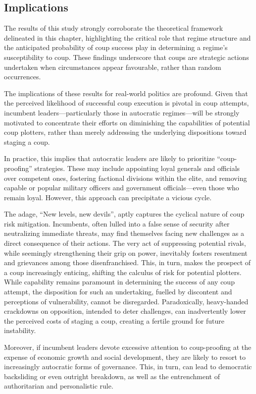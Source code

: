 \documentclass[
  12pt,
]{report}
\begin{document}
\subsection{Implications}\label{implications}

The results of this study strongly corroborate the theoretical framework
delineated in this chapter, highlighting the critical role that regime
structure and the anticipated probability of coup success play in
determining a regime's susceptibility to coup. These findings underscore
that coups are strategic actions undertaken when circumstances appear
favourable, rather than random occurrences.

The implications of these results for real-world politics are profound.
Given that the perceived likelihood of successful coup execution is
pivotal in coup attempts, incumbent leaders---particularly those in
autocratic regimes---will be strongly motivated to concentrate their
efforts on diminishing the capabilities of potential coup plotters,
rather than merely addressing the underlying dispositions toward staging
a coup.

In practice, this implies that autocratic leaders are likely to
prioritize ``coup-proofing'' strategies. These may include appointing
loyal generals and officials over competent ones, fostering factional
divisions within the elite, and removing capable or popular military
officers and government officials---even those who remain loyal.
However, this approach can precipitate a vicious cycle.

The adage, ``New levels, new devils'', aptly captures the cyclical
nature of coup risk mitigation. Incumbents, often lulled into a false
sense of security after neutralizing immediate threats, may find
themselves facing new challenges as a direct consequence of their
actions. The very act of suppressing potential rivals, while seemingly
strengthening their grip on power, inevitably fosters resentment and
grievances among those disenfranchised. This, in turn, makes the
prospect of a coup increasingly enticing, shifting the calculus of risk
for potential plotters. While capability remains paramount in
determining the success of any coup attempt, the disposition for such an
undertaking, fuelled by discontent and perceptions of vulnerability,
cannot be disregarded. Paradoxically, heavy-handed crackdowns on
opposition, intended to deter challenges, can inadvertently lower the
perceived costs of staging a coup, creating a fertile ground for future
instability.

Moreover, if incumbent leaders devote excessive attention to
coup-proofing at the expense of economic growth and social development,
they are likely to resort to increasingly autocratic forms of
governance. This, in turn, can lead to democratic backsliding or even
outright breakdown, as well as the entrenchment of authoritarian and
personalistic rule.
\end{document}
